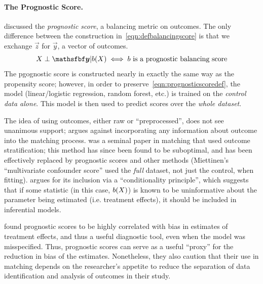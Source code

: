 \documentclass[11pt]{extarticle}
\begin{document}
\paragraph{The Prognostic Score.} \textcite{hansen_prognostic_2008} discussed the \emph{prognostic score}, a balancing metric on outcomes. The only difference between the construction in~\eqref{eqn:defbalancingscore} is that we exchange $\vec{z}$ for $\vec{y}$, a vector of outcomes.
\begin{equation}
  \mat{X} \perp \vec{y} | b(\mat{X}) \iff b \text{ is a prognostic balancing score} \label{eqn:prognosticscoredef}
\end{equation}
The pgognostic score is constructed nearly in exactly the same way as the propensity score; however, in order to preserve~\eqref{eqn:prognosticscoredef}, the model (linear/logistic regression, random forest, etc.) is trained on the \emph{control data alone}. This model is then used to predict scores over the \emph{whole dataset}.

The idea of using outcomes, either raw or ``preprocessed'', does not see unanimous support; \textcite{garrido_methods_2014} argues against incorporating any information about outcome into the matching process. \textcite{miettinen_stratification_1976} was a seminal paper in matching that used outcome stratification; this method has since been found to be suboptimal, and has been effectively replaced by prognostic scores and other methods \parencite{hansen_bias_2006} (Miettinen's ``multivariate confounder score'' used the \emph{full} dataset, not just the control, when fitting). \textcite{hansen_bias_2006} argues for its inclusion via a ``conditionality principle'', which suggests that if some statistic (in this case, $b(X)$) is known to be uninformative about the parameter being estimated (i.e. treatment effects), it should be included in inferential models.

\textcite{stuart_prognostic_2013} found prognostic scores to be highly correlated with bias in estimates of treatment effects, and thus a useful diagnostic tool, even when the model was misspecified. Thus, prognostic scores can serve as a useful ``proxy'' for the reduction in bias of the estimates. Nonetheless, they also caution that their use in matching depends on the researcher's appetite to reduce the separation of data identification and analysis of outcomes in their study.
\end{document}
